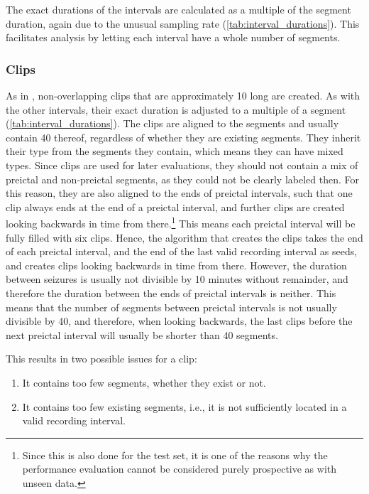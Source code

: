 The exact durations of the intervals are calculated as a multiple of the segment duration, again due to the unusual sampling rate (\cref{tab:interval_durations}). This facilitates analysis by letting each interval have a whole number of segments.

\begin{table}[!htbp]
    \centering
    
    \caption[Interval Durations]{The approximate and exact durations of the defined intervals, as multiples of segments.}
    \label{tab:interval_durations}
\end{table}

\subsubsection{Clips}
As in \textcite{yang_seizure_2024}, non-overlapping clips that are approximately \SI{10}{\min} long are created.
As with the other intervals, their exact duration is adjusted to a multiple of a segment (\cref{tab:interval_durations}).
The clips are aligned to the segments and usually contain 40 thereof, regardless of whether they are existing segments.
They inherit their type from the segments they contain, which means they can have mixed types.
Since clips are used for later evaluations, they should not contain a mix of preictal and non-preictal segments, as they could not be clearly labeled then.
For this reason, they are also aligned to the ends of preictal intervals, such that one clip always ends at the end of a preictal interval, and further clips are created looking backwards in time from there.\footnote{Since this is also done for the test set, it is one of the reasons why the performance evaluation cannot be considered purely prospective as with unseen data.}
This means each preictal interval will be fully filled with six clips.
Hence, the algorithm that creates the clips takes the end of each preictal interval, and the end of the last valid recording interval as seeds, and creates clips looking backwards in time from there.
However, the duration between seizures is usually not divisible by 10 minutes without remainder, and therefore the duration between the ends of preictal intervals is neither.
This means that the number of segments between preictal intervals is not usually divisible by 40, and therefore, when looking backwards, the last clips before the next preictal interval will usually be shorter than 40 segments.

This results in two possible issues for a clip:
\begin{enumerate}
    \item It contains too few segments, whether they exist or not.
    \item It contains too few existing segments, i.e., it is not sufficiently located in a valid recording interval.
\end{enumerate}

